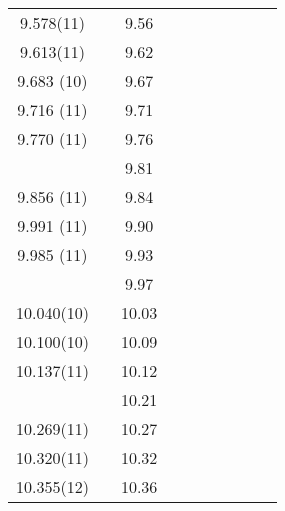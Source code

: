 \begin{landscape}
\begin{center}
\begin{longtable}{cc cc cc cc cc}
   9.578(11)    &              & 9.56     &         &            &                &       &          &          &      \\
   9.613(11)    &              & 9.62     &         &            &                &       &          &          &      \\
  9.683 (10)    &              & 9.67     &         &            &                &       &          &          &      \\
  9.716 (11)    &              & 9.71     &         &            &                &       &          &          &      \\
  9.770 (11)    &              & 9.76     &         &            &                &       &          &          &      \\
                &              & 9.81     &         &            &                &       &          &          &      \\
  9.856 (11)    &              & 9.84     &         &            &                &       &          &          &      \\
  9.991 (11)    &              & 9.90     &         &            &                &       &          &          &      \\
  9.985 (11)    &              & 9.93     &         &            &                &       &          &          &      \\
                &              & 9.97     &         &            &                &       &          &          &      \\
  10.040(10)    &              & 10.03    &         &            &                &       &          &          &      \\
  10.100(10)    &              & 10.09    &         &            &                &       &          &          &      \\
  10.137(11)    &              & 10.12    &         &            &                &       &          &          &      \\
                &              & 10.21    &         &            &                &       &          &          &      \\
  10.269(11)    &              & 10.27    &         &            &                &       &          &          &      \\
  10.320(11)    &              & 10.32    &         &            &                &       &          &          &      \\
  10.355(12)    &              & 10.36    &         &            &                &       &          &          &      \\

\end{longtable}
\end{center}
\end{landscape}
